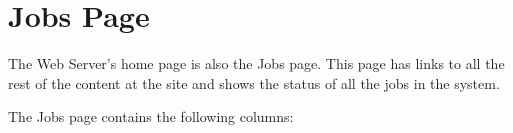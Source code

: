 % 
% 
% 
% 

    \section{Jobs Page}
    \label{sec:ws.jobs-page}
        The Web Server's home page is also the Jobs page. This page has links to all the rest of the content 
        at the site and shows the status of all the jobs in the system. 
    
        The Jobs page contains the following columns: 

